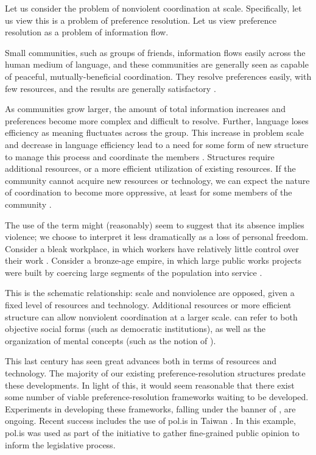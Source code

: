 Let us consider the problem of nonviolent coordination at scale.
Specifically, let us view this is a problem of preference resolution.
Let us view preference resolution as a problem of information flow.

Small communities, such as groups of friends, information flows easily across the human medium of language, and these communities are generally seen as capable of peaceful, mutually-beneficial coordination.
They resolve preferences easily, with few resources, and the results are generally satisfactory \cite{deacon}.

As communities grow larger, the amount of total information increases and preferences become more complex and difficult to resolve.
Further, language loses efficiency as meaning fluctuates across the group.
This increase in problem scale and decrease in language efficiency lead to a need for some form of new structure to manage this process and coordinate the members \cite{hobbes}.
Structures require additional resources, or a more efficient utilization of existing resources.
If the community cannot acquire new resources or technology, we can expect the nature of coordination to become more oppressive, at least for some members of the community \cite{eisenberg}.

The use of the term  might (reasonably) seem to suggest that its absence implies violence; we choose to interpret it less dramatically as a loss of personal freedom.
Consider a bleak workplace, in which workers have relatively little control over their work \cite{lin}.
Consider a bronze-age empire, in which large public works projects were built by coercing large segments of the population into service \cite{heilbroner}.

This is the schematic relationship: scale and nonviolence are opposed, given a fixed level of resources and technology.
Additional resources or more efficient structure can allow nonviolent coordination at a larger scale.
 can refer to both objective social forms (such as democratic institutions), as well as the organization of mental concepts (such as the notion of ).

This last century has seen great advances both in terms of resources and technology.
The majority of our existing preference-resolution structures predate these developments.
In light of this, it would seem reasonable that there exist some number of viable preference-resolution frameworks waiting to be developed.
Experiments in developing these frameworks, falling under the banner of , are ongoing.
Recent success includes the use of pol.is in Taiwan \cite{barry}.
In this example, pol.is was used as part of the  initiative to gather fine-grained public opinion to inform the legislative process.

